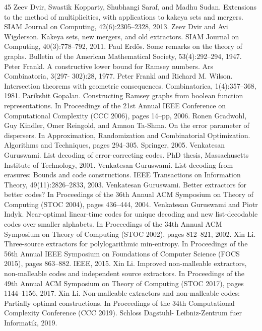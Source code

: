\documentclass[10pt,a4paper]{article}
\begin{document}
\begin{thebibliography}{45}
 Zeev Dvir, Swastik Kopparty, Shubhangi Saraf, and Madhu Sudan. Extensions to the method of multiplicities, with applications to kakeya sets and mergers. SIAM Journal on Computing, 42(6):2305–2328, 2013.
 Zeev Dvir and Avi Wigderson. Kakeya sets, new mergers, and old extractors. SIAM Journal on Computing, 40(3):778–792, 2011.
 Paul Erdös. Some remarks on the theory of graphs. Bulletin of the American Mathematical Society, 53(4):292–294, 1947.
 Peter Frankl. A constructive lower bound for Ramsey numbers. Ars Combinatoria, 3(297- 302):28, 1977.
 Peter Frankl and Richard M. Wilson. Intersection theorems with geometric consequences. Combinatorica, 1(4):357–368, 1981.
 Parikshit Gopalan. Constructing Ramsey graphs from boolean function representations. In Proceedings of the 21st Annual IEEE Conference on Computational Complexity (CCC 2006), pages 14–pp, 2006.
 Ronen Gradwohl, Guy Kindler, Omer Reingold, and Amnon Ta-Shma. On the error parameter of dispersers. In Approximation, Randomization and Combinatorial Optimization. Algorithms and Techniques, pages 294–305. Springer, 2005.
 Venkatesan Guruswami. List decoding of error-correcting codes. PhD thesis, Massachusetts Institute of Technology, 2001.
 Venkatesan Guruswami. List decoding from erasures: Bounds and code constructions. IEEE Transactions on Information Theory, 49(11):2826–2833, 2003.
 Venkatesan Guruswami. Better extractors for better codes? In Proceedings of the 36th Annual ACM Symposium on Theory of Computing (STOC 2004), pages 436–444, 2004.
 Venkatesan Guruswami and Piotr Indyk. Near-optimal linear-time codes for unique decoding and new list-decodable codes over smaller alphabets. In Proceedings of the 34th Annual ACM Symposium on Theory of Computing (STOC 2002), pages 812–821, 2002.
 Xin Li. Three-source extractors for polylogarithmic min-entropy. In Proceedings of the 56th Annual IEEE Symposium on Foundations of Computer Science (FOCS 2015), pages 863–882. IEEE, 2015.
 Xin Li. Improved non-malleable extractors, non-malleable codes and independent source extractors. In Proceedings of the 49th Annual ACM Symposium on Theory of Computing (STOC 2017), pages 1144–1156, 2017.
 Xin Li. Non-malleable extractors and non-malleable codes: Partially optimal constructions. In Proceedings of the 34th Computational Complexity Conference (CCC 2019). Schloss Dagstuhl- Leibniz-Zentrum fuer Informatik, 2019.

\end{thebibliography}
\end{document}
